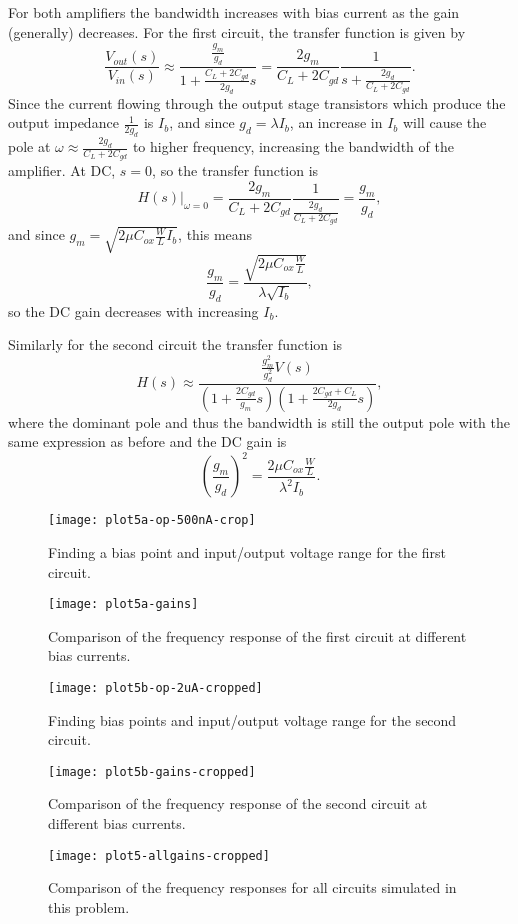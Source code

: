 \documentclass{article}
\begin{document}
For both amplifiers the bandwidth increases with bias current as the gain 
(generally) decreases. For the first circuit, the transfer function is given by
$$
\frac{V_{out}(s)}{V_{in}(s)} 
  \approx \frac{\frac{g_m}{g_d}}{1 + \frac{C_L + 2 C_{gd}}{2 g_d} s}
  = \frac{2 g_m}{C_L + 2C_{gd}}\frac{1}{s + \frac{2 g_d}{C_L + 2 C_{gd}}}.
$$
Since the current flowing through the output stage transistors which produce 
the output impedance $\frac{1}{2 g_d}$ is $I_b$, and since $g_d = \lambda I_b$, 
an increase in $I_b$ will cause the pole at 
$\omega \approx \frac{2 g_d}{C_L + 2 C_{gd}}$ to higher frequency, increasing
the bandwidth of the amplifier. At DC, $s = 0$, so the transfer function is
$$
\left.H(s)\right|_{\omega = 0} 
     = \frac{2 g_m}{C_L + 2 C_{gd}} \frac{1}{\frac{2 g_d}{C_L + 2 C_{gd}}}
     = \frac{g_m}{g_d},
$$
and since $g_m = \sqrt{2 \mu C_{ox} \frac{W}{L} I_b}$, this means
$$
\frac{g_m}{g_d} = \frac{\sqrt{2 \mu C_{ox} \frac{W}{L}}}{\lambda\sqrt{I_b}},
$$
so the DC gain decreases with increasing $I_b$.

Similarly for the second circuit the transfer function is
$$
H(s) \approx \frac{\frac{g_m^2}{g_d^2} V(s)}
                  {(1 + \frac{2 C_{gd}}{g_m} s)
                   (1 + \frac{2 C_{gd} + C_L}{2 g_d} s)},
$$
where the dominant pole and thus the bandwidth is still
the output pole with the same expression as before and the
DC gain is
$$
\left(\frac{g_m}{g_d}\right)^2 = \frac{2 \mu C_{ox} \frac{W}{L}}{\lambda^2 I_b}.
$$

\begin{sidewaysfigure}
  \centering
  \texttt{[image: plot5a-op-500nA-crop]}
  \caption{Finding a bias point and input/output voltage range for the 
           first circuit.  \label{fig:op-5a-500nA}}
\end{sidewaysfigure}

\begin{sidewaysfigure}
  \centering
  \texttt{[image: plot5a-gains]}
  \caption{Comparison of the frequency response of the first circuit
           at different bias currents. \label{fig:op-5a-gains}}
\end{sidewaysfigure}

\begin{sidewaysfigure}
  \centering
  \texttt{[image: plot5b-op-2uA-cropped]}
  \caption{Finding bias points and input/output voltage range for the 
           second circuit.  \label{fig:op-5b-2uA}}
\end{sidewaysfigure}

\begin{sidewaysfigure}
  \centering
  \texttt{[image: plot5b-gains-cropped]}
  \caption{Comparison of the frequency response of the second circuit
           at different bias currents. \label{fig:op-5b-gains}}
\end{sidewaysfigure}

\begin{sidewaysfigure}
  \centering
  \texttt{[image: plot5-allgains-cropped]}
  \caption{Comparison of the frequency responses for all circuits simulated
           in this problem. \label{fig:allgains}}
\end{sidewaysfigure}
\end{document}

